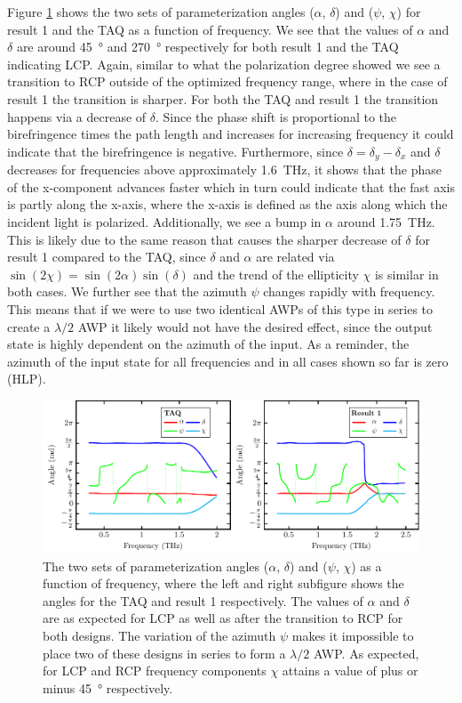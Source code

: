 Figure \ref{fig:cl4_params} shows the two sets of parameterization angles ($\alpha$, $\delta$) and ($\psi$, $\chi$) for result 1 and the TAQ as a function of frequency. We see that the values of $\alpha$ and $\delta$ are around \SI{45}{\degree} and \SI{270}{\degree} respectively for both result 1 and the TAQ indicating LCP. Again, similar to what the polarization degree showed we see a transition to RCP outside of the optimized frequency range, where in the case of result 1 the transition is sharper. For both the TAQ and result 1 the transition happens via a decrease of $\delta$. Since the phase shift is proportional to the birefringence times the path length and increases for increasing frequency it could indicate that the birefringence is negative. Furthermore, since $\delta = \delta_y - \delta_x$ and $\delta$ decreases for frequencies above approximately \SI{1.6}{\tera \hertz}, it shows that the phase of the x-component advances faster which in turn could indicate that the fast axis is partly along the x-axis, where the x-axis is defined as the axis along which the incident light is polarized. Additionally, we see a bump in $\alpha$ around \SI{1.75}{\tera \hertz}. This is likely due to the same reason that causes the sharper decrease of $\delta$ for result 1 compared to the TAQ, since $\delta$ and $\alpha$ are related via $\sin(2\chi)=\sin(2\alpha)\sin(\delta)$ and the trend of the ellipticity $\chi$ is similar in both cases. We further see that the azimuth $\psi$ changes rapidly with frequency. This means that if we were to use two identical AWPs of this type in series to create a $\lambda/2$ AWP it likely would not have the desired effect, since the output state is highly dependent on the azimuth of the input. As a reminder, the azimuth of the input state for all frequencies and in all cases shown so far is zero (HLP).

\begin{figure}[ht]
    \centering
    \includegraphics[scale=0.75]{images/results/plots/ceramic/params_dotted.pdf}
    \caption{The two sets of parameterization angles ($\alpha$, $\delta$) and ($\psi$, $\chi$) as a function of frequency, where the left and right subfigure shows the angles for the TAQ and result 1 respectively. The values of $\alpha$ and $\delta$ are as expected for LCP as well as after the transition to RCP for both designs. The variation of the azimuth $\psi$ makes it impossible to place two of these designs in series to form a $\lambda/2$ AWP. As expected, for LCP and RCP frequency components $\chi$ attains a value of plus or minus \SI{45}{\degree} respectively.}
    \label{fig:cl4_params}
\end{figure}

